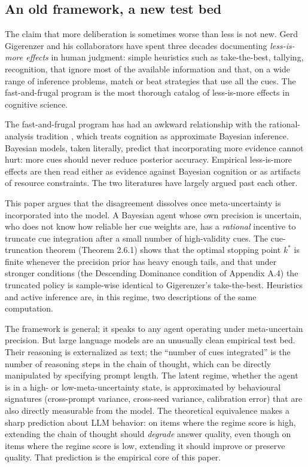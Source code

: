 \documentclass{article}
\begin{document}
\subsection{An old framework, a new test
bed}\label{an-old-framework-a-new-test-bed}

The claim that more deliberation is sometimes worse than less is not
new. Gerd Gigerenzer and his collaborators \cite{gigerenzer1996, gigerenzer2009} have spent three decades documenting
\emph{less-is-more effects} in human judgment: simple heuristics such as
take-the-best, tallying, recognition, that ignore most of the available
information and that, on a wide range of inference problems, match or
beat strategies that use all the cues. The fast-and-frugal program is
the most thorough catalog of less-is-more effects in cognitive science.

The fast-and-frugal program has had an awkward relationship with the
rational-analysis tradition \cite{anderson1991, oaksford2007, lieder2020}, which treats cognition as approximate
Bayesian inference. Bayesian models, taken literally, predict that
incorporating more evidence cannot hurt: more cues should never reduce
posterior accuracy. Empirical less-is-more effects are then read either
as evidence against Bayesian cognition or as artifacts of resource
constraints. The two literatures have largely argued past each other.

This paper argues that the disagreement dissolves once meta-uncertainty
is incorporated into the model. A Bayesian agent whose own precision is
uncertain, who does not know how reliable her cue weights are, has a
\emph{rational} incentive to truncate cue integration after a small
number of high-validity cues. The cue-truncation theorem (Theorem 2.6.1)
shows that the optimal stopping point \(k^{*}\) is finite whenever the
precision prior has heavy enough tails, and that under stronger
conditions (the Descending Dominance condition of Appendix A.4) the
truncated policy is sample-wise identical to Gigerenzer's take-the-best.
Heuristics and active inference are, in this regime, two descriptions of
the same computation.

The framework is general; it speaks to any agent operating under
meta-uncertain precision. But large language models are an unusually
clean empirical test bed. Their reasoning is externalized as text; the
``number of cues integrated'' is the number of reasoning steps in the
chain of thought, which can be directly manipulated by specifying prompt
length. The latent regime, whether the agent is in a high- or
low-meta-uncertainty state, is approximated by behavioural signatures
(cross-prompt variance, cross-seed variance, calibration error) that are
also directly measurable from the model. The theoretical equivalence
makes a sharp prediction about LLM behavior: on items where the regime
score is high, extending the chain of thought should \emph{degrade}
answer quality, even though on items where the regime score is low,
extending it should improve or preserve quality. That prediction is the
empirical core of this paper.
\end{document}
